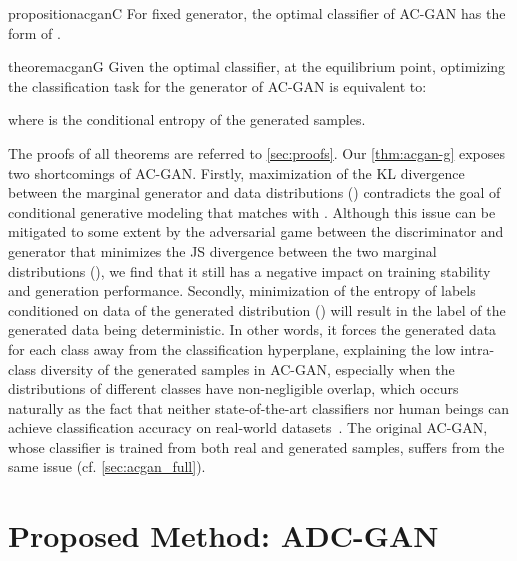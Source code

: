 \documentclass[nohyperref]{article}
\theoremstyle{plain}
\theoremstyle{definition}
\theoremstyle{remark}
\begin{document}
\begin{restatable}{proposition}{acganC}\label{pro:acgan-c}
For fixed generator, the optimal classifier of AC-GAN has the form of .
\end{restatable}

\begin{restatable}{theorem}{acganG}\label{thm:acgan-g}
Given the optimal classifier, at the equilibrium point, optimizing the classification task for the generator of AC-GAN is equivalent to:

where  is the conditional entropy of the generated samples.
\end{restatable}

The proofs of all theorems are referred to \cref{sec:proofs}.
Our \cref{thm:acgan-g} exposes two shortcomings of AC-GAN.
Firstly, maximization of the KL divergence between the marginal generator and data distributions () contradicts the goal of conditional generative modeling that matches  with .
Although this issue can be mitigated to some extent by the adversarial game between the discriminator and generator that minimizes the JS divergence between the two marginal distributions (), we find that it still has a negative impact on training stability and generation performance.
Secondly, minimization of the entropy of labels conditioned on data of the generated distribution () will result in the label of the generated data being deterministic.
In other words, it forces the generated data for each class away from the classification hyperplane, explaining the low intra-class diversity of the generated samples in AC-GAN, especially when the distributions of different classes have non-negligible overlap, which occurs naturally as the fact that neither state-of-the-art classifiers nor human beings can achieve  classification accuracy on real-world datasets~\cite{russakovsky2015imagenet}.
The original AC-GAN, whose classifier is trained from both real and generated samples, suffers from the same issue (cf. \cref{sec:acgan_full}).


\section{Proposed Method: ADC-GAN}
\end{document}
